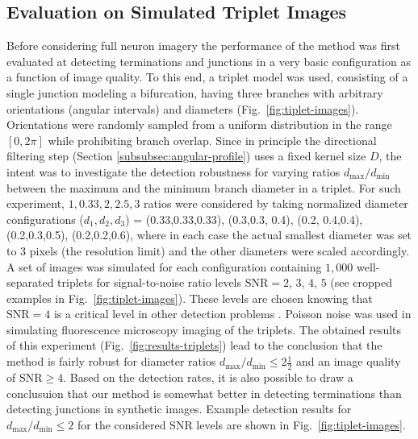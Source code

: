 \subsection{Evaluation on Simulated Triplet Images}
\label{subsec:experiments-triplets}
Before considering full neuron imagery the performance of the method was first evaluated at detecting terminations and junctions in a very basic configuration as a function of image quality. To this end, a triplet model was used, consisting of a single junction modeling a bifurcation, having three branches with arbitrary orientations (angular intervals) and diameters (Fig.~\ref{fig:tiplet-images}). Orientations were randomly sampled from a uniform distribution in the range $[0, 2\pi]$ while prohibiting branch overlap. Since in principle the directional filtering step (Section \ref{subsubsec:angular-profile}) uses a fixed kernel size $D$, the intent was to investigate the detection robustness for varying ratios $d_{\max}/d_{\min}$ between the maximum and the minimum branch diameter in a triplet. For such experiment, $1,0.33,2,2.5,3$ ratios were considered by taking normalized diameter configurations ($d_1,d_2,d_3$) = (0.33,0.33,0.33), (0.3,0.3, 0.4), (0.2, 0.4,0.4), (0.2,0.3,0.5), (0.2,0.2,0.6), where in each case the actual smallest diameter was set to 3 pixels (the resolution limit) and the other diameters were scaled accordingly. A set of images was simulated for each configuration containing $1,000$ well-separated triplets for signal-to-noise ratio levels $\textrm{SNR}=2$, $3$, $4$, $5$ (see cropped examples in Fig.~\ref{fig:tiplet-images}). These levels are chosen knowing that $\textrm{SNR}=4$ is a critical level in other detection problems \cite{smal2010quantitative, chenouard2014objective}. Poisson noise was used in simulating fluorescence microscopy imaging of the triplets. The obtained results of this experiment (Fig.~\ref{fig:results-triplets}) lead to the conclusion that the method is fairly robust for diameter ratios $d_{\max}/d_{\min}\leq2\frac{1}{2}$ and an image quality of $\textrm{SNR} \geq 4$. Based on the detection rates, it is also possible to draw a conclusuion that our method is somewhat better in detecting terminations than detecting junctions in synthetic images. Example detection results for $d_{\max}/d_{\min}\leq2$ for the considered SNR levels are shown in Fig.~\ref{fig:tiplet-images}.

